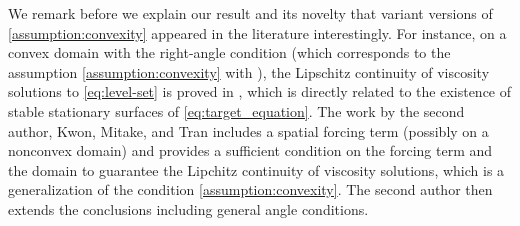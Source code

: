 \documentclass[11pt]{article}
\makeatletter
\numberwithin{equation}{section}
\newcommand{\pOmega}[0]{\partial\Omega}
\newcommand{\sgrad}[0]{\nabla_{\pOmega}}
\def\leq{\leqslant}
\newcounter{mathrecordid}
\newcommand{\mathboxbegin}[1]{%
  \stepcounter{mathrecordid}%
  \immediate\write\mathrecords{\themathrecordid,#1}%
  \special{pdf:bann << /Type /Annot /Subtype /Link /Border [0 0 0]
    /MathBoxID \themathrecordid /F 2
    /A << /S /URI /URI (urn:mathbox:\themathrecordid) >> >>}}
\newcommand{\mathboxinlineplain}[1]{$#1$}
\newcommand{\mathboxinline}[1]{%
  $\mathboxbegin{inline}%
  \special{pdf:literal direct /MathBoxBegin\themathrecordid\space MP}%
  #1\special{pdf:literal direct /MathBoxEnd\themathrecordid\space MP}%
  \special{pdf:eann}$}
\newcommand{\recordmath}{%
  \ifmeasuring@\expandafter\mathboxinlineplain
  \else\expandafter\mathboxinline\fi}
\makeatother
\begin{document}



We remark before we explain our result and its novelty that variant versions of \eqref{assumption:convexity} appeared in the literature interestingly. For instance, on a convex domain with the right-angle condition (which corresponds to the assumption \eqref{assumption:convexity} with \recordmath{\beta\equiv0}), the Lipschitz continuity of viscosity solutions to \eqref{eq:level-set} is proved in \cite{GOS99}, which is directly related to the existence of stable stationary surfaces of \eqref{eq:target_equation}.
The work \cite{JKMT22} by the second author, Kwon, Mitake, and Tran includes a spatial forcing term (possibly on a nonconvex domain) and provides a sufficient condition on the forcing term and the domain to guarantee the Lipchitz continuity of viscosity solutions, which is a generalization of the condition \eqref{assumption:convexity}. The second author \cite{J23} then extends the conclusions including general angle conditions.
\end{document}
